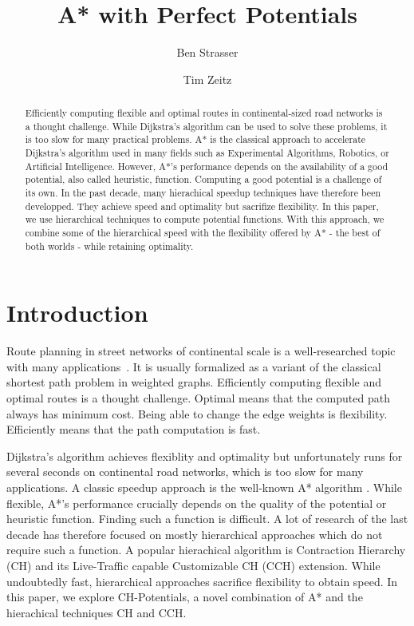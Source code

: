 \documentclass[a4paper,UKenglish,cleveref, autoref]{lipics-v2019}
\title{A* with Perfect Potentials} %
\author{Ben Strasser}{Germany}{academia@ben-strasser.net}{TODO}{}%
\author{Tim Zeitz}{Institute of Theoretical Informatics, Algorithmics I, Karlsruhe Institute of Technology, Germany}{tim.zeitz@kit.edu}{}{}
\begin{document}
\maketitle

\begin{abstract}
Efficiently computing flexible and optimal routes in continental-sized road networks is a thought challenge.
While Dijkstra's algorithm can be used to solve these problems, it is too slow for many practical problems.
A* is the classical approach to accelerate Dijkstra's algorithm used in many fields such as Experimental Algorithms, Robotics, or Artificial Intelligence.
However, A*'s performance depends on the availability of a good potential, also called heuristic, function.
Computing a good potential is a challenge of its own.
In the past decade, many hierachical speedup techniques have therefore been developped.
They achieve speed and optimality but sacrifize flexibility.
In this paper, we use hierarchical techniques to compute potential functions.
With this approach, we combine some of the hierarchical speed with the flexibility offered by A* - the best of both worlds - while retaining optimality.
\end{abstract}

\section{Introduction}
\label{sec:intro}
Route planning in street networks of continental scale is a well-researched topic with many applications~\cite{bdgmpsww-rptn-16}.
It is usually formalized as a variant of the classical shortest path problem in weighted graphs.
Efficiently computing flexible and optimal routes is a thought challenge.
Optimal means that the computed path always has minimum cost.
Being able to change the edge weights is flexibility.
Efficiently means that the path computation is fast.

Dijkstra's algorithm \cite{?} achieves flexiblity and optimality but unfortunately runs for several seconds on continental road networks, which is too slow for many applications.
A classic speedup approach is the well-known A* algorithm \cite{hnr-afbhd-68}.
While flexible, A*'s performance crucially depends on the quality of the potential or heuristic function.
Finding such a function is difficult.
A lot of research of the last decade has therefore focused on mostly hierarchical approaches \cite{CH,CCH,CRP,HIGHWAYHIERACHIES,MLD} which do not require such a function.
A popular hierachical algorithm is Contraction Hierarchy (CH) \cite{?} and its Live-Traffic capable Customizable CH (CCH) \cite{?} extension.
While undoubtedly fast, hierarchical approaches sacrifice flexibility to obtain speed.
In this paper, we explore CH-Potentials, a novel combination of A* and the hierachical techniques CH and CCH.
\end{document}
